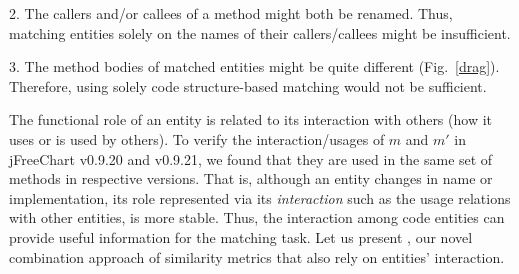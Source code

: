 2. The callers and/or callees of a method might both be renamed. Thus,
   matching entities solely on the names of their callers/callees
   might be insufficient.

3. The method bodies of matched entities might be quite different
   (Fig.~\ref{drag}). Therefore, using solely code structure-based
   matching would not be sufficient.

The functional role of an entity is related to its interaction with
others (\eg how it uses or is used by others). To verify the
interaction/usages of $m$ and $m'$ in jFreeChart v0.9.20 and v0.9.21,
we found that
they are used in the same set of methods in respective versions. 
That is, although an entity changes in name or implementation, its
role represented via its \emph{interaction} such as the usage
relations with other entities, is more stable. Thus, the interaction
among code entities can provide useful information for the matching
task. Let us present {\tool}, our novel combination approach of
similarity metrics that also rely on entities' interaction.







